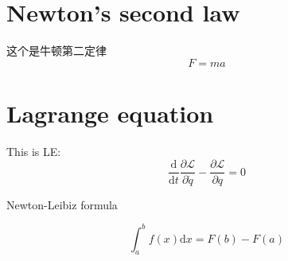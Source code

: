 \documentclass{article}
\begin{document}
\section{Newton's second law}
这个是牛顿第二定律
    $$
    F=ma
    $$

\section{Lagrange equation}
This is LE:
$$
\dfrac{\mathrm{d}}{\mathrm{d}t}\dfrac{\partial\mathcal{L}}{\partial\dot{q}}-\dfrac{\partial\mathcal{L}}{\partial q}=0
$$

Newton-Leibiz formula

$$
\int_a^b f(x)\mathrm{d}x = F(b)-F(a)
$$
\end{document}
